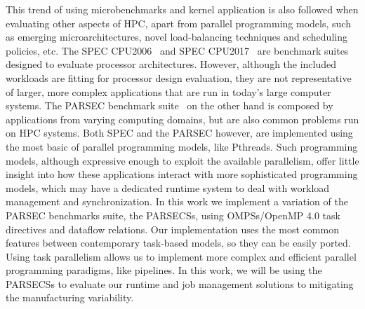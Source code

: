 This trend of using microbenchmarks and kernel application is also followed when
evaluating other aspects of HPC, apart from parallel programming models, such as emerging
microarchitectures, novel load-balancing techniques and scheduling policies, etc.  The
SPEC CPU2006~\cite{Henning:2006:SCB:1186736.1186737} and SPEC
CPU2017~\cite{Bucek:2018:SCN:3185768.3185771} are benchmark suites designed to evaluate
processor architectures.  However, although the included workloads are fitting for
processor design evaluation, they are not representative of larger, more complex
applications that are run in today's large computer systems.  The PARSEC benchmark
suite~\cite{bienia2008} on the other hand is composed by applications from varying
computing domains, but are also common problems run on HPC systems.  Both SPEC and the
PARSEC however, are implemented using the most basic of parallel programming models, like
Pthreads.  Such programming models, although expressive enough to exploit the available
parallelism, offer little insight into how these applications interact with more
sophisticated programming models, which may have a dedicated runtime system to deal with
workload management and synchronization.  In this work we implement a variation of the
PARSEC benchmarks suite, the PARSECSs, using OMPSs/OpenMP 4.0 task directives and dataflow
relations.  Our implementation uses the most common features between contemporary
task-based models, so they can be easily ported.  Using task parallelism allows us to
implement more complex and efficient parallel programming paradigms, like pipelines.  In
this work, we will be using the PARSECSs to evaluate our runtime and job management
solutions to mitigating the manufacturing variability.
 
